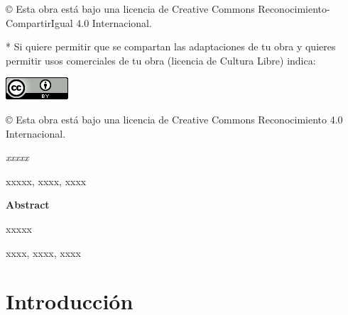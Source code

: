 \documentclass[a4paper,12pt,oneside]{scrbook}
\newenvironment{abstract}
{\par\noindent\begin{center}\textbf{\abstractname}\end{center}\begin{itshape}\par\noindent}
{\end{itshape}}
\newenvironment{summary}
{\par\noindent\begin{center}\textbf{Abstract}\end{center}\begin{itshape}\par\noindent}
{\end{itshape}}
\newenvironment{keywords}
{\begin{list}{}{\setlength{\leftmargin}{1em}}\item[\hskip\labelsep \bfseries Keywords:]}
{\end{list}}
\newenvironment{palabrasClave}
{\begin{list}{}{\setlength{\leftmargin}{1em}}\item[\hskip\labelsep \bfseries Palabras clave:]}
{\end{list}}
\begin{document}
\begin{large}
© Esta obra está bajo una licencia de Creative Commons Reconocimiento-CompartirIgual 4.0 Internacional.
\end{large}

\bigskip
\bigskip
\bigskip
* Si quiere permitir que se compartan las adaptaciones de tu obra y quieres permitir usos comerciales de tu obra (licencia de Cultura Libre) indica:

\begin{center}
\includegraphics[scale=1.8]{images/by_88x31}\\[5mm]
\end{center}

\begin{large}
© Esta obra está bajo una licencia de Creative Commons Reconocimiento 4.0 Internacional.
\end{large}

\thispagestyle{empty}
\vspace*{200px}

\begin{abstract}
{\em
xxxxx
}

\begin{palabrasClave}
xxxxx, xxxx, xxxx
\end{palabrasClave}

\end{abstract}
\thispagestyle{empty}
\vspace*{200px}

\begin{summary}
{
xxxxx
}

\begin {keywords}
xxxx, xxxx, xxxx
\end {keywords}

\end{summary}

\cleardoublepage
\setcounter{page}{1} 

\tableofcontents
\listoffigures
\listoftables

\mainmatter

\chapter{Introducción}
\label{chapter:intro}
\end{document}
